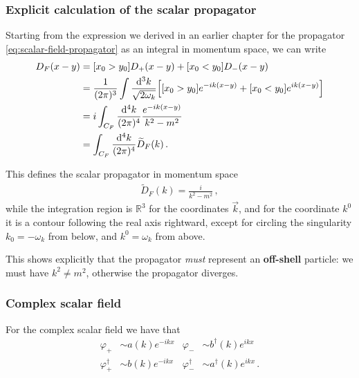 \documentclass[main.tex]{subfiles}
\begin{document}
\subsubsection{Explicit calculation of the scalar propagator}

Starting from the expression we derived in an earlier chapter for the propagator \eqref{eq:scalar-field-propagator} as an integral in momentum space, we can write 
%
\begin{subequations}
\begin{align}
D_F (x-y) &= [x_0 > y_0 ] D_+ (x-y) + [x_0 < y_0 ] D_- (x-y)  \\
&= \frac{1}{(2 \pi )^3} \int \frac{ \dd[3]{k}}{\sqrt{2 \omega_{k}}}
\qty[[x_0 > y_0 ] e^{-ik(x-y)} + [x_0 < y_0 ] e^{ik(x-y)}]  \\
&= i \int_{C_F} \frac{ \dd[4]{k}}{(2 \pi )^{4}}\frac{e^{-ik(x-y)}}{k^2-m^2}\\
&= \int_{C_F} \frac{ \dd[4]{k}}{(2 \pi )^{4}} \widetilde{D}_{F} (k)
\,.
\end{align}
\end{subequations}

This defines the scalar propagator in momentum space 
%
\begin{align}
\widetilde{D}_{F}(k) = \frac{i}{k^2- m^2}
\,,
\end{align}
%
while the integration region is \(\mathbb{R}^{3}\) for the coordinates \(\vec{k}\), and for the coordinate \(k^{0}\) it is a contour following the real axis rightward, except for circling the singularity \(k_0 = - \omega_{k}\) from below, and \(k^{0} = \omega_{k}\) from above. 

This shows explicitly that the propagator \emph{must} represent an \textbf{off-shell} particle: we must have \(k^2 \neq m^2\), otherwise the propagator diverges.

\subsubsection{Complex scalar field}

For the complex scalar field we have that 
%
\begin{subequations}
\begin{align}
\varphi_{+} &\sim a(k) e^{-ikx} 
&
\varphi_{-} &\sim b ^\dag(k) e^{ikx}  \\
\varphi_{+}^\dag &\sim b(k) e^{-ikx} 
&
\varphi_{-}^\dag &\sim a ^\dag(k) e^{ikx}
\,.
\end{align}
\end{subequations}
\end{document}
